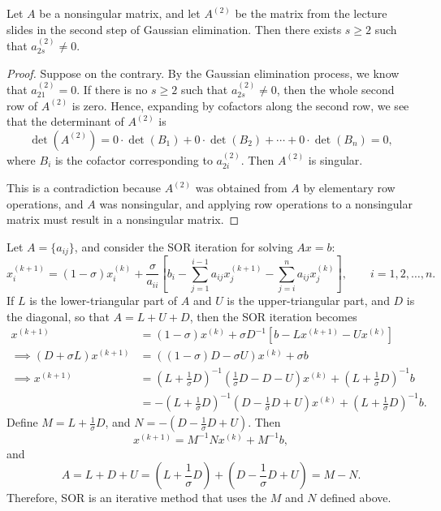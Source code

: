 \documentclass{homework}
\begin{document}
	\maketitle
	
	\question
	\newcommand{\atwo}{A^{(2)}}
	Let $A$ be a nonsingular matrix, and let $\atwo$ be the matrix from the lecture slides in the second step of Gaussian elimination. Then there exists $s \ge 2$ such that $a_{2s}^{(2)} \ne 0$.
	\begin{proof}
		Suppose on the contrary. By the Gaussian elimination process, we know that $a_{21}^{(2)} = 0$. If there is no $s \ge 2$ such that $a_{2s}^{(2)} \ne 0$, then the whole second row of $\atwo$ is zero. Hence, expanding by cofactors along the second row, we see that the determinant of $\atwo$ is
		\begin{equation}
			\det\left(\atwo\right) = 0\cdot\det(B_1) + 0\cdot\det(B_2) + \cdots +0\cdot\det(B_n) = 0,
		\end{equation}
		where $B_i$ is the cofactor corresponding to $a^{(2)}_{2i}$. Then $\atwo$ is singular.
		
		This is a contradiction because $\atwo$ was obtained from $A$ by elementary row operations, and $A$ was nonsingular, and applying row operations to a nonsingular matrix must result in a nonsingular matrix.
	\end{proof}
	
	\question
	Let $A = \{a_{ij}\}$, and consider the SOR iteration for solving $Ax = b$:
	\begin{equation}
		x^{(k+1)}_i = (1-\sigma)x^{(k)}_i + \frac{\sigma}{a_{ii}}\left[b_i - \sum_{j=1}^{i-1}a_{ij}x^{(k+1)}_j - \sum_{j=i}^na_{ij}x^{(k)}_j\right], \qquad i=1,2,\dots,n.
	\end{equation}
	If $L$ is the lower-triangular part of $A$ and $U$ is the upper-triangular part, and $D$ is the diagonal, so that $A = L + U +D$, then the SOR iteration becomes
	\begin{align}
		x^{(k+1)} &= (1-\sigma)x^{(k)} + \sigma D^{-1}\left[b -Lx^{(k+1)} - Ux^{(k)}\right] \\
		\implies (D + \sigma L)x^{(k+1)} &= ((1-\sigma)D-\sigma U)x^{(k)} + \sigma b \\
		\implies x^{(k+1)} &= \left(L + \frac{1}{\sigma}D\right)^{-1}\left(\frac{1}{\sigma}D - D - U\right)x^{(k)} + \left(L + \frac{1}{\sigma}D\right)^{-1}b \\
		&= -\left(L+\frac{1}{\sigma}D\right)^{-1}\left(D - \frac{1}{\sigma}D +U\right)x^{(k)} +\left(L+\frac{1}{\sigma}D\right)^{-1}b.
	\end{align}
	Define $M = L + \frac{1}{\sigma}D$, and $N = -\left(D-\frac{1}{\sigma}D+U\right)$. Then
	\begin{equation}
		x^{(k+1)} = M^{-1}Nx^{(k)} + M^{-1}b,
	\end{equation}
	and
	\begin{equation}
		A = L + D + U = \left(L+\frac{1}{\sigma}D\right) + \left(D - \frac{1}{\sigma}D + U\right) = M - N.
	\end{equation}
	Therefore, SOR is an iterative method that uses the $M$ and $N$ defined above.
	
\end{document}
